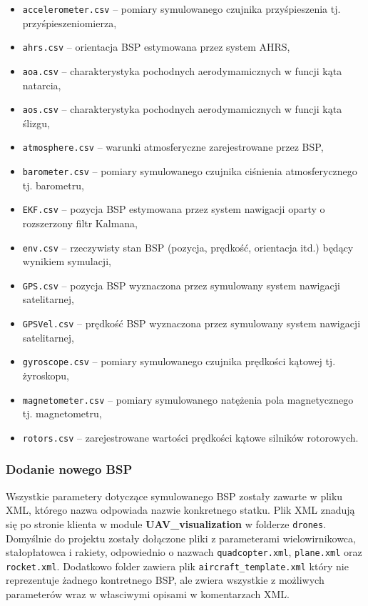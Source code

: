 \documentclass[15pt]{sprawozdanie}
\begin{document}
 \begin{itemize}[noitemsep]
\item \texttt{accelerometer.csv} -- pomiary symulowanego czujnika przyśpieszenia tj. przyśpieszeniomierza,
\item \texttt{ahrs.csv} -- orientacja BSP estymowana przez system AHRS,
\item \texttt{aoa.csv} -- charakterystyka pochodnych aerodymamicznych w funcji kąta natarcia,
\item \texttt{aos.csv} -- charakterystyka pochodnych aerodymamicznych w funcji kąta ślizgu,
\item \texttt{atmosphere.csv} -- warunki atmosferyczne zarejestrowane przez BSP,
\item \texttt{barometer.csv} -- pomiary symulowanego czujnika ciśnienia atmosferycznego tj. barometru,
\item \texttt{EKF.csv} -- pozycja BSP estymowana przez system nawigacji oparty o rozszerzony filtr Kalmana,
\item \texttt{env.csv} -- rzeczywisty stan BSP (pozycja, prędkość, orientacja itd.) będący wynikiem symulacji,
\item \texttt{GPS.csv} -- pozycja BSP wyznaczona przez symulowany system nawigacji satelitarnej,
\item \texttt{GPSVel.csv} -- prędkość BSP wyznaczona przez symulowany system nawigacji satelitarnej,
\item \texttt{gyroscope.csv} -- pomiary symulowanego czujnika prędkości kątowej tj. żyroskopu,
\item \texttt{magnetometer.csv} -- pomiary symulowanego natężenia pola magnetycznego tj. magnetometru,
\item \texttt{rotors.csv} -- zarejestrowane wartości prędkości kątowe silników rotorowych.
\end{itemize}



\subsubsection{Dodanie nowego BSP}

Wszystkie parametery dotyczące symulowanego BSP zostały zawarte w pliku XML, którego nazwa odpowiada nazwie konkretnego statku. Plik XML znadują się po stronie klienta w module \textbf{UAV\_visualization} w folderze \texttt{drones}. Domyślnie do projektu zostały dołączone pliki z parameterami wielowirnikowca, stałopłatowca i rakiety, odpowiednio o nazwach \texttt{quadcopter.xml}, \texttt{plane.xml} oraz \texttt{rocket.xml}. Dodatkowo folder zawiera plik \texttt{aircraft\_template.xml} który nie reprezentuje żadnego kontretnego BSP, ale zwiera wszystkie z możliwych parameterów wraz w własciwymi opisami w komentarzach XML.\\
\end{document}
